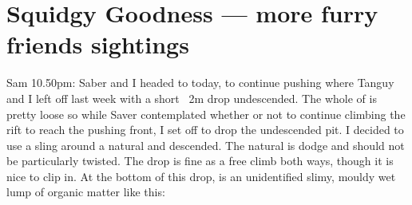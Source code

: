 \section{Squidgy Goodness --- more furry friends sightings}
\begin{marginfigure}
\end{marginfigure}


Sam 10.50pm: Saber and I headed to  today, to continue pushing where Tanguy and I left off last week with a short ~2m drop undescended. The whole of  is pretty loose so while Saver contemplated whether or not to continue climbing the rift to reach the pushing front, I set off to drop the undescended pit.
I decided to use a sling around a natural and descended. The natural is dodge and should not be particularly twisted. The drop is fine as a free climb both ways, though it is nice to clip in. At the bottom of this drop, is an unidentified slimy, mouldy wet lump of organic matter like this: 

